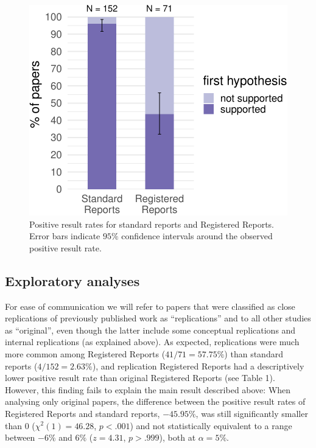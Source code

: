 \documentclass[british,,jou,floatsintext]{apa6}
\begin{document}
\begin{figure}
\centering
\includegraphics{positive_results_SRs_RRs_files/figure-latex/mainplot-1.pdf}
\caption{\label{fig:mainplot}Positive result rates for standard reports and Registered Reports. Error bars indicate \(95 \%\) confidence intervals around the observed positive result rate.}
\end{figure}

\hypertarget{exploratory-analyses}{%
\subsection{Exploratory analyses}\label{exploratory-analyses}}

For ease of communication we will refer to papers that were classified as close replications of previously published work as \enquote{replications} and to all other studies as \enquote{original}, even though the latter include some conceptual replications and internal replications (as explained above).
As expected, replications were much more common among Registered Reports (\(41 / 71 = 57.75\%\)) than standard reports (\(4 / 152 = 2.63\%\)), and replication Registered Reports had a descriptively lower positive result rate than original Registered Reports (see Table 1).
However, this finding fails to explain the main result described above:
When analysing only original papers, the difference between the positive result rates of Registered Reports and standard reports, \(-45.95\%\), was still significantly smaller than 0 (\(\chi^2(1) = 46.28\), \(p < .001\)) and not statistically equivalent to a range between \(-6\%\) and \(6\%\) (\(z = 4.31\), \(p > .999\)), both at \(\alpha = 5\%\).
\end{document}
